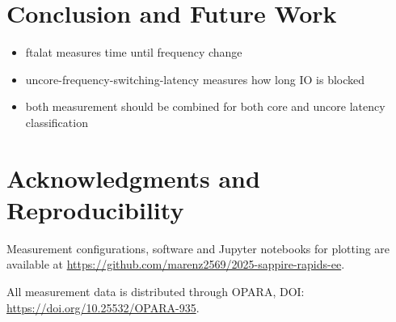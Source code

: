 \chapter{Conclusion and Future Work}
\label{sec:summary}

\begin{itemize}
    \item ftalat measures time until frequency change
    \item uncore-frequency-switching-latency measures how long IO is blocked
    \item both measurement should be combined for both core and uncore latency classification
\end{itemize}

\chapter*{Acknowledgments and Reproducibility}
Measurement configurations, software and Jupyter notebooks for plotting are available at \url{https://github.com/marenz2569/2025-sappire-rapids-ee}.

All measurement data is distributed through OPARA, DOI: \url{https://doi.org/10.25532/OPARA-935}.
